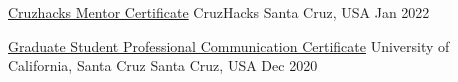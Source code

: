 

\begin{cvhonors}

  \cvhonor
    {\href{https://drive.google.com/file/d/1kkuhZshzdEiIgcwvlWEpmlF8dU1YwG6I/view?usp=sharing}{Cruzhacks Mentor Certificate}} %
    {CruzHacks} %
    {Santa Cruz, USA} %
    {Jan 2022} %

  \cvhonor
    {\href{https://drive.google.com/file/d/1wAr-5Nau_k7tt1DnsJT6V9rUzVNyZJq7/view?usp=sharing}{Graduate Student Professional Communication Certificate}} %
    {University of California, Santa Cruz} %
    {Santa Cruz, USA} %
    {Dec 2020} %

\end{cvhonors}
